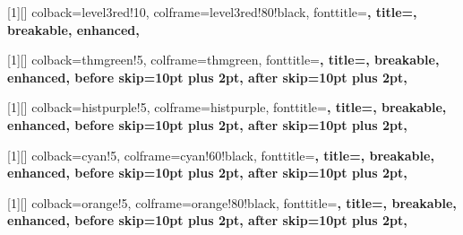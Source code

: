 [1][\relax]{
  colback=level3red!10,
  colframe=level3red!80!black,
  fonttitle=\bfseries,
  title={},
  breakable,
  enhanced,
}

[1][\relax]{
  colback=thmgreen!5,
  colframe=thmgreen,
  fonttitle=\bfseries,
  title={},
  breakable,
  enhanced,
  before skip=10pt plus 2pt,
  after skip=10pt plus 2pt,
}

[1][\relax]{
  colback=histpurple!5,
  colframe=histpurple,
  fonttitle=\bfseries,
  title={},
  breakable,
  enhanced,
  before skip=10pt plus 2pt,
  after skip=10pt plus 2pt,
}

[1][\relax]{
  colback=cyan!5,
  colframe=cyan!60!black,
  fonttitle=\bfseries,
  title={},
  breakable,
  enhanced,
  before skip=10pt plus 2pt,
  after skip=10pt plus 2pt,
}

[1][\relax]{
  colback=orange!5,
  colframe=orange!80!black,
  fonttitle=\bfseries,
  title={},
  breakable,
  enhanced,
  before skip=10pt plus 2pt,
  after skip=10pt plus 2pt,
}

